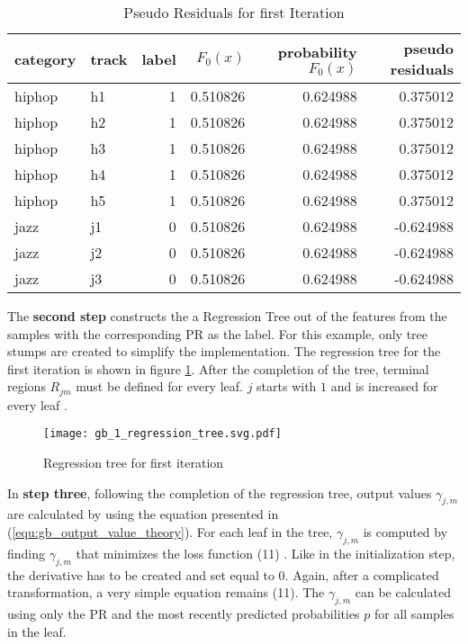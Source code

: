 \begin{table}[H]
    \centering
    \begin{tabular}{llrrrr}
        \toprule
        category & track &  label & \(F_{0}(x)\) &  probability \(F_{0}(x)\) &  pseudo residuals \\
        \midrule
          hiphop &    h1 &      1 & 0.510826 &         0.624988 &            0.375012 \\
          hiphop &    h2 &      1 & 0.510826 &         0.624988 &            0.375012 \\
          hiphop &    h3 &      1 & 0.510826 &         0.624988 &            0.375012 \\
          hiphop &    h4 &      1 & 0.510826 &         0.624988 &            0.375012 \\
          hiphop &    h5 &      1 & 0.510826 &         0.624988 &            0.375012 \\
            jazz &    j1 &      0 & 0.510826 &         0.624988 &           -0.624988 \\
            jazz &    j2 &      0 & 0.510826 &         0.624988 &           -0.624988 \\
            jazz &    j3 &      0 & 0.510826 &         0.624988 &           -0.624988 \\
        \bottomrule
        \end{tabular} 
    \caption{Pseudo Residuals for first Iteration}%
    \label{tbl:theory_pseudo_residuals_1_iteration}%
  \end{table} 

The \textbf{second step} constructs the a Regression Tree out of the features from the samples with the corresponding 
PR as the label. For this example, only tree stumps are created to simplify the implementation. 
The regression tree for the first iteration is shown in figure \ref{fig:gb_1_regression_tree}. After the completion of the 
tree, terminal regions \(R_{jm}\) must be defined for every leaf. \(j\) starts with \(1\) and is increased for 
every leaf \cite[p.1195]{Friedman_2001}. 

\begin{figure}[H]
    \centering
    \caption[]{Regression tree for first iteration}
	\label{fig:gb_1_regression_tree}
    \texttt{[image: gb\_1\_regression\_tree.svg.pdf]}
\end{figure}

In \textbf{step three}, following the completion of the regression tree, output values \(\gamma_{j, m}\) are calculated by using 
the equation presented in (\ref{equ:gb_output_value_theory}). For each leaf in the tree, \(\gamma_{j, m}\) is computed by finding 
\(\gamma_{j, m}\) that minimizes the loss function (11) \cite[p.361]{Hastie_2009}. Like in the initialization step, the derivative has 
to be created and set equal to \(0\). Again, after a complicated transformation, a very simple 
equation remains (11). The \(\gamma_{j, m}\)  can be calculated using only the \ac{PR} and the most 
recently predicted probabilities \(p\) for all samples in the leaf. 

